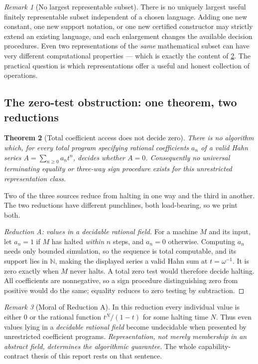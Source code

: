 \documentclass[11pt,letterpaper]{article}
\numberwithin{equation}{section}
\newtheorem{theorem}{Theorem}[section]
\theoremstyle{definition}
\theoremstyle{remark}
\newtheorem{remark}[theorem]{Remark}
\newcommand{\N}{\mathbb N}
\begin{document}
\begin{remark}[No largest representable subset]\label{cas:rem-nolargest}
There is no uniquely largest useful finitely representable subset independent of
a chosen language. Adding one new constant, one new support notation, or one new
certified constructor may strictly extend an existing language, and each
enlargement changes the available decision procedures. Even two representations
of the \emph{same} mathematical subset can have very different computational
properties --- which is exactly the content of \cref{cas:thm-zerotest}. The
practical question is which representations offer a useful and honest collection
of operations.
\end{remark}

\subsection{The zero-test obstruction: one theorem, two reductions}
\label{cas:sub-zerotest}
\begin{theorem}[Total coefficient access does not decide zero]
\label{cas:thm-zerotest}
There is no algorithm which, for every total program specifying rational
coefficients $a_n$ of a valid Hahn series $A=\sum_{n\ge0}a_nt^n$, decides
whether $A=0$. Consequently no universal terminating equality or three-way sign
procedure exists for this unrestricted representation class.
\end{theorem}

Two of the three sources reduce from halting in one way and the third in
another. The two reductions have different punchlines, both load-bearing, so we
print both.

\begin{proof}[Reduction A: values in a decidable rational field]
For a machine $M$ and its input, let $a_n=1$ if $M$ has halted \emph{within} $n$
steps, and $a_n=0$ otherwise. Computing $a_n$ needs only bounded simulation, so
the sequence is total computable, and its support lies in $\N$, making the
displayed series a valid Hahn sum at $t=\omega^{-1}$. It is zero exactly when
$M$ never halts. A total zero test would therefore decide halting. All
coefficients are nonnegative, so a sign procedure distinguishing zero from
positive would do the same; equality reduces to zero testing by subtraction.
\end{proof}

\begin{remark}[Moral of Reduction A]\label{cas:rem-moralA}
In this reduction every individual value is either $0$ or the rational function
$t^N/(1-t)$ for some halting time $N$. Thus even values lying in a
\emph{decidable rational field} become undecidable when presented by
unrestricted coefficient programs. \emph{Representation, not merely membership
in an abstract field, determines the algorithmic guarantee.} The whole
capability-contract thesis of this report rests on that sentence.
\end{remark}
\end{document}

